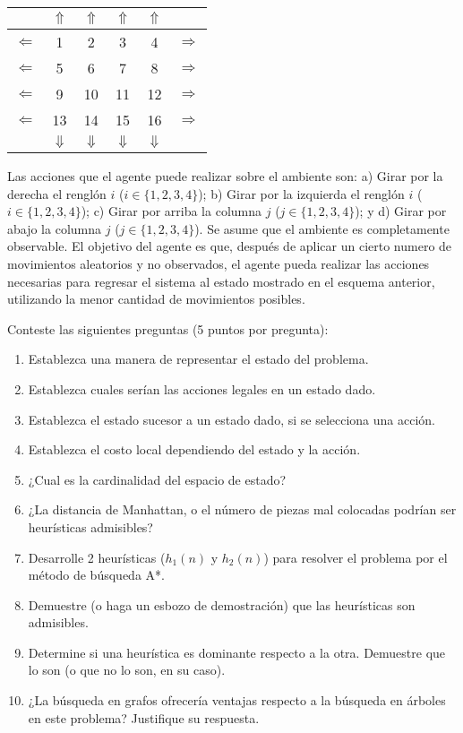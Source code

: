 \documentclass[onecolumn, letter, 12pt]{article}
\begin{document}
\begin{center}
\begin{tabular}{c|c|c|c|c|c}
           & $\Uparrow$& $\Uparrow$& $\Uparrow$& $\Uparrow$&            \\
\hline
$\Leftarrow$ &     1     &     2     &     3     &      4    & $\Rightarrow$ \\
\hline
$\Leftarrow$ &     5     &     6     &     7     &      8    & $\Rightarrow$ \\
\hline
$\Leftarrow$ &     9     &    10     &    11     &     12    & $\Rightarrow$ \\
\hline
$\Leftarrow$ &    13     &    14     &    15     &     16    & $\Rightarrow$ \\
\hline
            & $\Downarrow$ & $\Downarrow$ & $\Downarrow$ & $\Downarrow$ &  \\
\end{tabular}
\end{center}

Las acciones que el agente puede realizar sobre el ambiente son: a) Girar por la derecha
el renglón $i$ ($i \in \{1,2,3,4\}$); b) Girar por la izquierda el renglón $i$ ($i \in
\{1,2,3,4\}$); c) Girar por arriba la columna $j$ ($j \in \{1,2,3,4\}$); y d) Girar por
abajo la columna $j$ ($j \in \{1,2,3,4\}$). Se asume que el ambiente es completamente
observable. El objetivo del agente es que, después de aplicar un cierto numero de movimientos aleatorios
y no observados, el agente pueda realizar las acciones necesarias para regresar el sistema
al estado mostrado en el esquema anterior, utilizando la menor cantidad de movimientos
posibles.

Conteste las siguientes preguntas (5 puntos por pregunta):

\begin{enumerate}
\item Establezca una manera de representar el estado del problema.
\item Establezca cuales serían las acciones legales en un estado dado.
\item Establezca el estado sucesor a un estado dado, si se selecciona una acción.
\item Establezca el costo local dependiendo del estado y la acción.
\item ¿Cual es la cardinalidad del espacio de estado?
\item ¿La distancia de Manhattan, o el número de piezas mal colocadas podrían ser
  heurísticas admisibles?
\item Desarrolle 2 heurísticas ($h_1(n)$ y $h_2(n)$) para resolver el problema por el método de búsqueda A*.
\item Demuestre (o haga un esbozo de demostración) que las heurísticas son admisibles.
\item Determine si una heurística es dominante respecto a la otra. Demuestre que lo son (o que no lo son, en su caso).
\item ¿La búsqueda en grafos ofrecería ventajas respecto a la búsqueda en árboles en este problema? Justifique su respuesta.
\end{enumerate}
\end{document}

